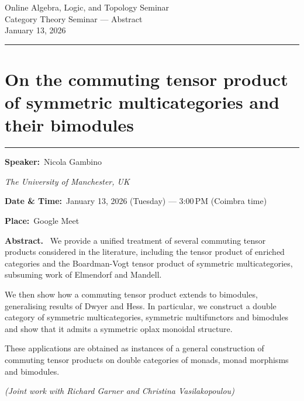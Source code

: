 \documentclass[11pt,a4paper]{article}
\newcommand{\Title}[1]{\section*{#1}\vspace{-0.25em}\hrule\vspace{0.8em}}
\newcommand{\Field}[2]{\textbf{#1:}~#2\par}
\newcommand{\Affil}[1]{\textit{#1}\par}
\newcommand{\Abstract}{\vspace{0.6em}\textbf{Abstract.}~}
\begin{document}
	
	\begin{center}
		{\LARGE Online Algebra, Logic, and Topology Seminar}\\[0.25em]
		{\large Category Theory Seminar — Abstract}\\[0.5em]
		January 13, 2026
	\end{center}
	
	\vspace{1.25em}\hrule\vspace{1.25em}
	
	\Title{On the commuting tensor product of symmetric multicategories and their bimodules}
	
	\Field{Speaker}{Nicola Gambino}
	\Affil{The University of Manchester, UK}
	
	\Field{Date \& Time}{January 13, 2026 (Tuesday) — 3{:}00\,PM (Coimbra time)}
	\Field{Place}{Google Meet}
	
	\Abstract
We provide a unified treatment of several commuting tensor products considered in the literature,
including the tensor product of enriched categories and the Boardman-Vogt tensor product of symmetric multicategories, subsuming work of Elmendorf and Mandell.  

We then show how a commuting tensor product  extends to bimodules, generalising results of Dwyer and Hess. In particular, we construct a double category of symmetric multicategories, symmetric multifunctors and bimodules and show that it admits a symmetric oplax monoidal structure.

These applications are obtained as instances of a general construction of commuting tensor products on double categories of monads, monad morphisms and bimodules.  

	\medskip
	\textit{(Joint work with Richard Garner and Christina Vasilakopoulou)}
	
\end{document}
